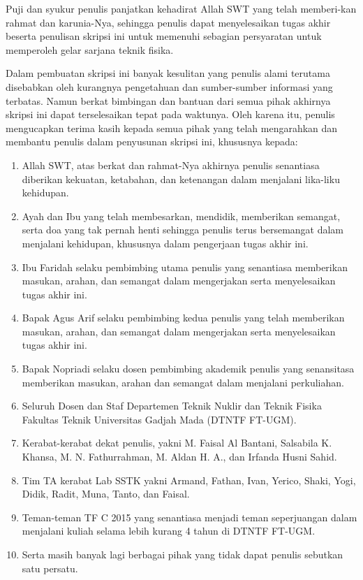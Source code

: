 Puji dan syukur penulis panjatkan kehadirat Allah SWT yang telah memberi-kan rahmat dan karunia-Nya, sehingga penulis dapat menyelesaikan tugas akhir beserta penulisan skripsi ini untuk memenuhi sebagian persyaratan untuk memperoleh gelar sarjana teknik fisika.

Dalam pembuatan skripsi ini banyak kesulitan yang penulis alami terutama disebabkan oleh kurangnya pengetahuan dan sumber-sumber informasi yang terbatas. Namun berkat bimbingan dan bantuan dari semua pihak akhirnya skripsi ini dapat terselesaikan tepat pada waktunya. Oleh karena itu, penulis mengucapkan terima kasih kepada semua pihak yang telah mengarahkan dan membantu penulis dalam penyusunan skripsi ini, khususnya kepada:

\begin{enumerate}
	\item Allah SWT, atas berkat dan rahmat-Nya akhirnya penulis senantiasa diberikan kekuatan, ketabahan, dan ketenangan dalam menjalani lika-liku kehidupan.
	\item Ayah dan Ibu yang telah membesarkan, mendidik, memberikan semangat, serta doa yang tak pernah henti sehingga penulis terus bersemangat dalam menjalani kehidupan, khususnya dalam pengerjaan tugas akhir ini.
	\item Ibu Faridah selaku pembimbing utama penulis yang senantiasa memberikan masukan, arahan, dan semangat dalam mengerjakan serta menyelesaikan tugas akhir ini.
	\item Bapak Agus Arif selaku pembimbing kedua penulis yang telah memberikan masukan, arahan, dan semangat dalam mengerjakan serta menyelesaikan tugas akhir ini.
	\item Bapak Nopriadi selaku dosen pembimbing akademik penulis yang senansitasa memberikan masukan, arahan dan semangat dalam menjalani perkuliahan.
	\item Seluruh Dosen dan Staf Departemen Teknik Nuklir dan Teknik Fisika Fakultas Teknik Universitas Gadjah Mada (DTNTF FT-UGM).
	\item Kerabat-kerabat dekat penulis, yakni M. Faisal Al Bantani, Salsabila K. Khansa, M. N. Fathurrahman, M. Aldan H. A., dan Irfanda Husni Sahid.	
	\item Tim TA kerabat Lab SSTK yakni Armand, Fathan, Ivan, Yerico, Shaki, Yogi, Didik, Radit, Muna, Tanto, dan Faisal.
	\item Teman-teman TF C 2015 yang senantiasa menjadi teman seperjuangan dalam menjalani kuliah selama lebih kurang 4 tahun di DTNTF FT-UGM.
	\item Serta masih banyak lagi berbagai pihak yang tidak dapat penulis sebutkan satu persatu.
\end{enumerate}

